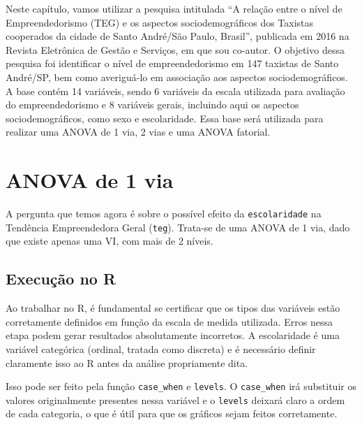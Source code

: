 \documentclass[
]{book}
\begin{document}
Neste capítulo, vamos utilizar a pesquisa intitulada ``A relação entre o nível de Empreendedorismo (TEG) e os aspectos sociodemográficos dos Taxistas cooperados da cidade de Santo André/São Paulo, Brasil'', publicada em 2016 na Revista Eletrônica de Gestão e Serviços, em que sou co-autor. O objetivo dessa pesquisa foi identificar o nível de empreendedorismo em 147 taxistas de Santo André/SP, bem como averiguá-lo em associação aos aspectos sociodemográficos. A base contém 14 variáveis, sendo 6 variáveis da escala utilizada para avaliação do empreendedorismo e 8 variáveis gerais, incluindo aqui os aspectos sociodemográficos, como sexo e escolaridade. Essa base será utilizada para realizar uma ANOVA de 1 via, 2 vias e uma ANOVA fatorial.

\hypertarget{anova-de-1-via}{%
\section{ANOVA de 1 via}\label{anova-de-1-via}}

A pergunta que temos agora é sobre o possível efeito da \texttt{escolaridade} na Tendência Empreendedora Geral (\texttt{teg}). Trata-se de uma ANOVA de 1 via, dado que existe apenas uma VI, com mais de 2 níveis.

\hypertarget{execuuxe7uxe3o-no-r-1}{%
\subsection{Execução no R}\label{execuuxe7uxe3o-no-r-1}}

Ao trabalhar no R, é fundamental se certificar que os tipos das variáveis estão corretamente definidos em função da escala de medida utilizada. Erros nessa etapa podem gerar resultados absolutamente incorretos. A escolaridade é uma variável categórica (ordinal, tratada como discreta) e é necessário definir claramente isso ao R antes da análise propriamente dita.

Isso pode ser feito pela função \texttt{case\_when} e \texttt{levels}. O \texttt{case\_when} irá substituir os valores originalmente presentes nessa variável e o \texttt{levels} deixará claro a ordem de cada categoria, o que é útil para que os gráficos sejam feitos corretamente.
\end{document}
